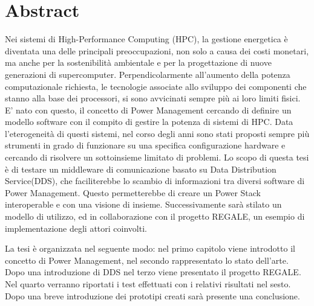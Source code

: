 \section*{Abstract}
\label{TODO}
Nei sistemi di High-Performance Computing (HPC), la gestione energetica è diventata una delle principali preoccupazioni, non solo a causa dei costi monetari, ma anche per la sostenibilità ambientale e per la progettazione di nuove generazioni di supercomputer\cite{growth}. Perpendicolarmente all'aumento della potenza computazionale richiesta, le tecnologie associate allo sviluppo dei componenti che stanno alla base dei processori, si sono avvicinati sempre più ai loro limiti fisici. E' nato con questo, il concetto di Power Management cercando di definire un modello software con il compito di gestire la potenza di sistemi di HPC. Data l'eterogeneità di questi sistemi, nel corso degli anni sono stati proposti sempre più strumenti in grado di funzionare su una specifica configurazione hardware e cercando di risolvere un sottoinsieme limitato di problemi. Lo scopo di questa tesi è di testare un middleware di comunicazione basato su Data Distribution Service(DDS), che faciliterebbe lo scambio di informazioni tra diversi software di Power Management. Questo permetterebbe di creare un Power Stack interoperable e con una visione di insieme. Successivamente sarà stilato un modello di utilizzo, ed in collaborazione con il progetto REGALE, un esempio di implementazione degli attori coinvolti.

La tesi è organizzata nel seguente modo: nel primo capitolo viene introdotto il concetto di Power Management, nel secondo rappresentato lo stato dell'arte. Dopo una introduzione di DDS nel terzo viene presentato il progetto REGALE. Nel quarto verranno riportati i test effettuati con i relativi risultati nel sesto. Dopo una breve introduzione dei prototipi creati sarà presente una conclusione.

